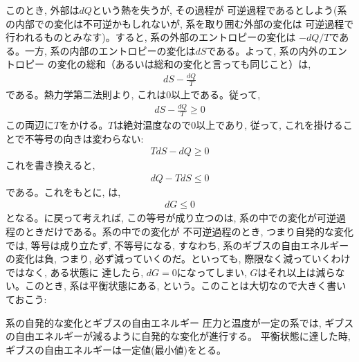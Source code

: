 このとき, 外部は$dQ$という熱を失うが, その過程が
可逆過程であるとしよう(系の内部での変化は不可逆かもしれないが, 系を取り囲む外部の変化は
可逆過程で行われるものとみなす)。すると, 系の外部のエントロピーの変化は
$-dQ/T$である。一方, 系の内部のエントロピーの変化は$dS$である。よって, 系の内外のエントロピー
の変化の総和（あるいは総和の変化と言っても同じこと）は, 
\begin{eqnarray}
dS-\frac{dQ}{T}
\end{eqnarray}
である。熱力学第二法則より, これは0以上である。従って, 
\begin{eqnarray}
dS-\frac{dQ}{T}\ge 0\label{eq:Gibbs_explain4}
\end{eqnarray}
この両辺に$T$をかける。$T$は絶対温度なので0以上であり, 従って, これを掛けることで不等号の向きは変わらない:
\begin{eqnarray}
TdS-dQ\ge 0
\end{eqnarray}
これを書き換えると, 
\begin{eqnarray}
dQ-TdS\le 0
\end{eqnarray}
である。これをもとに, は, 
\begin{eqnarray}
dG\le 0\label{eq:dGle0}
\end{eqnarray}
となる。に戻って考えれば, この等号が成り立つのは, 
系の中での変化が可逆過程のときだけである。系の中での変化が
不可逆過程のとき, つまり自発的な変化では, 等号は成り立たず, 
不等号になる, すなわち, 系のギブスの自由エネルギーの変化は負, つまり, 
必ず減っていくのだ。といっても, 際限なく減っていくわけではなく, ある状態に
達したら, $dG=0$になってしまい, $G$はそれ以上は減らない。このとき, 
系は平衡状態にある, という。このことは大切なので大きく書いておこう:

\begin{itembox}{系の自発的な変化とギブスの自由エネルギー}
圧力と温度が一定の系では, ギブスの自由エネルギーが減るように自発的な変化が進行する。
平衡状態に達した時, ギブスの自由エネルギーは一定値(最小値)をとる。
\end{itembox}


